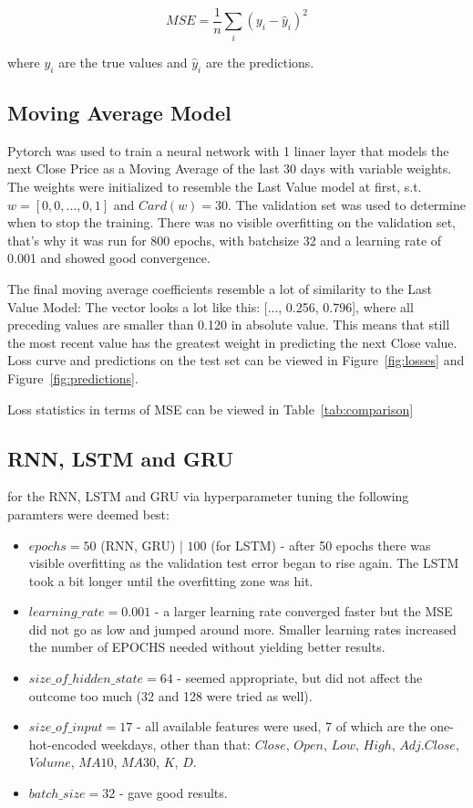 \documentclass[utf8x]{ctexart}
\begin{document}
\[ MSE = \frac{1}{n} \sum_i{(y_i - \hat{y}_i)^2}\]

where $y_i$ are the true values and $\hat{y}_i$ are the predictions.

\subsection{Moving Average Model}

Pytorch was used to train a neural network with 1 linaer layer that models the next Close Price as a Moving Average of the last 30 days with variable weights. The weights were initialized to resemble the Last Value model at first, s.t. $w = [0,0,\dots,0,1]$ and $Card(w) = 30$. The validation set was used to determine when to stop the training. There was no visible overfitting on the validation set, that's why it was run for 800 epochs, with batchsize 32 and a learning rate of 0.001 and showed good convergence.

The final moving average coefficients resemble a lot of similarity to the Last Value Model: The vector looks a lot like this: [..., 0.256, 0.796], where all preceding values are smaller than 0.120 in absolute value. This means that still the most recent value has the greatest weight in predicting the next Close value.
Loss curve and predictions on the test set can be viewed in Figure~\ref{fig:losses} and Figure~\ref{fig:predictions}.

Loss statistics in terms of MSE can be viewed in Table~\ref{tab:comparison}

\subsection{RNN, LSTM and GRU}

for the RNN, LSTM and GRU via hyperparameter tuning the following paramters were deemed best:
\begin{itemize}
  \item $epochs = 50$ (RNN, GRU) | $100$ (for LSTM) - after 50 epochs there was visible overfitting as the validation test error began to rise again. The LSTM took a bit longer until the overfitting zone was hit.
  \item $learning\_rate = 0.001$ - a larger learning rate converged faster but the MSE did not go as low and jumped around more. Smaller learning rates increased the number of EPOCHS needed without yielding better results.
  \item $size\_of\_hidden\_state = 64$ - seemed appropriate, but did not affect the outcome too much (32 and 128 were tried as well).
  \item $size\_of\_input = 17$ - all available features were used, 7 of which are the one-hot-encoded weekdays, other than that: $Close$, $Open$, $Low$, $High$, $Adj.Close$, $Volume$, $MA10$, $MA30$, $K$, $D$.
  \item $batch\_size = 32 $ - gave good results.
\end{itemize}
\end{document}
